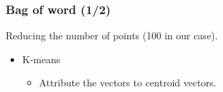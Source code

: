\documentclass[xcolor=table]{beamer}
\begin{document}
\begin{frame} \frametitle{Bag of word (1/2)}


Reducing the number of points (100 in our case).

\begin{itemize}
\item K-means
\begin{itemize}
\item Attribute the vectors to centroid vectors.
\end{itemize}
\end{itemize}


\end{frame}
\end{document}
